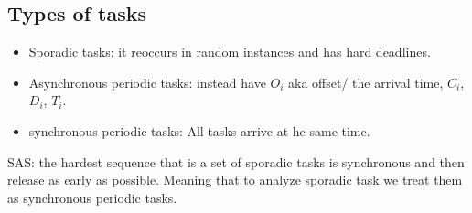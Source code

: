 \subsection{Types of tasks}
\begin{itemize}
  \item Sporadic tasks: it reoccurs in random instances and has hard deadlines.%
  \item Asynchronous periodic tasks: instead have $O_i$ aka offset/ the arrival time, $C_i$, $D_i$, $T_i$.
  \item synchronous periodic tasks: All tasks arrive at he same time.
\end{itemize}
SAS: the hardest sequence that is a set of sporadic tasks is synchronous and then release as early as possible.
Meaning that to analyze sporadic task we treat them as synchronous periodic tasks.

